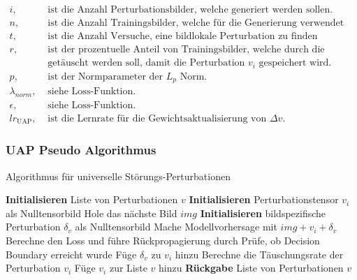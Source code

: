 \begin{align*}
i, &\text{ ist die Anzahl Perturbationsbilder, welche generiert werden sollen.} \\
n, &\text{ ist die Anzahl Trainingsbilder, welche für die Generierung verwendet werden.} \\
t, &\text{ ist die Anzahl Versuche, eine bildlokale Perturbation zu finden}\\
r, &\text{ ist der prozentuelle Anteil von Trainingsbilder, welche durch die Perturbationen} \\ 
&\text{  getäuscht werden soll, damit die Perturbation } v_i \text{ gespeichert wird.} \\
p, &\text{ ist der Normparameter der } L_p \text{ Norm.}\\
\lambda_{norm}, &\text{ siehe Loss-Funktion.}\\
\epsilon, &\text{ siehe Loss-Funktion.}\\
lr_{\text{UAP}}, &\text{ ist die Lernrate für die Gewichtsaktualisierung von $\Delta v$.}
\end{align*}

\subsubsection{UAP Pseudo Algorithmus}

\begin{algorithm}
\caption{Algorithmus für universelle Störungs-Perturbationen}
\begin{algorithmic}[1]
\STATE \textbf{Initialisieren} Liste von Perturbationen $v$
    \STATE \textbf{Initialisieren} Perturbationstensor $v_i$ als Nulltensorbild
            \STATE Hole das nächste Bild $img$
            \STATE \textbf{Initialisieren} bildspezifische Perturbation $\delta_v$ als Nulltensorbild
                \REPEAT
                    \STATE Mache Modellvorhersage mit $img + v_i + \delta_v$
                    \STATE Berechne den Loss und führe Rückpropagierung durch
                    \STATE Prüfe, ob Decision Boundary erreicht wurde
                        \STATE Füge $\delta_v$ zu $v_i$ hinzu
                    \ENDIF
            \ENDIF
        \ENDFOR
        \STATE Berechne die Täuschungsrate der Perturbation $v_i$
    \ENDFOR
    \STATE Füge $v_i$ zur Liste $v$ hinzu
\ENDFOR
\STATE \textbf{Rückgabe} Liste von Perturbationen $v$
\end{algorithmic}
\end{algorithm}
